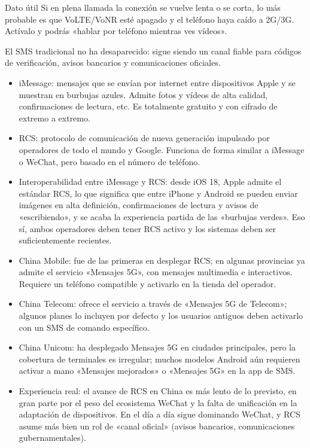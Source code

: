 \begin{tcbinfo}{Dato útil}
Si en plena llamada la conexión se vuelve lenta o se corta, lo más probable es que VoLTE/VoNR esté apagado y el teléfono haya caído a 2G/3G. Actívalo y podrás «hablar por teléfono mientras ves vídeos».

\end{tcbinfo}


El SMS tradicional no ha desaparecido: sigue siendo un canal fiable para códigos de verificación, avisos bancarios y comunicaciones oficiales.

\begin{itemize}
  \item iMessage: mensajes que se envían por internet entre dispositivos Apple y se muestran en burbujas azules. Admite fotos y vídeos de alta calidad, confirmaciones de lectura, etc. Es totalmente gratuito y con cifrado de extremo a extremo.
  \item RCS: protocolo de comunicación de nueva generación impulsado por operadores de todo el mundo y Google. Funciona de forma similar a iMessage o WeChat, pero basado en el número de teléfono.
  \item Interoperabilidad entre iMessage y RCS: desde iOS 18, Apple admite el estándar RCS, lo que significa que entre iPhone y Android se pueden enviar imágenes en alta definición, confirmaciones de lectura y avisos de «escribiendo», y se acaba la experiencia partida de las «burbujas verdes». Eso sí, ambos operadores deben tener RCS activo y los sistemas deben ser suficientemente recientes.
\end{itemize}


\begin{itemize}
  \item China Mobile: fue de las primeras en desplegar RCS; en algunas provincias ya admite el servicio «Mensajes 5G», con mensajes multimedia e interactivos. Requiere un teléfono compatible y activarlo en la tienda del operador.
  \item China Telecom: ofrece el servicio a través de «Mensajes 5G de Telecom»; algunos planes lo incluyen por defecto y los usuarios antiguos deben activarlo con un SMS de comando específico.
  \item China Unicom: ha desplegado Mensajes 5G en ciudades principales, pero la cobertura de terminales es irregular; muchos modelos Android aún requieren activar a mano «Mensajes mejorados» o «Mensajes 5G» en la app de SMS.
  \item Experiencia real: el avance de RCS en China es más lento de lo previsto, en gran parte por el peso del ecosistema WeChat y la falta de unificación en la adaptación de dispositivos. En el día a día sigue dominando WeChat, y RCS asume más bien un rol de «canal oficial» (avisos bancarios, comunicaciones gubernamentales).
\end{itemize}

